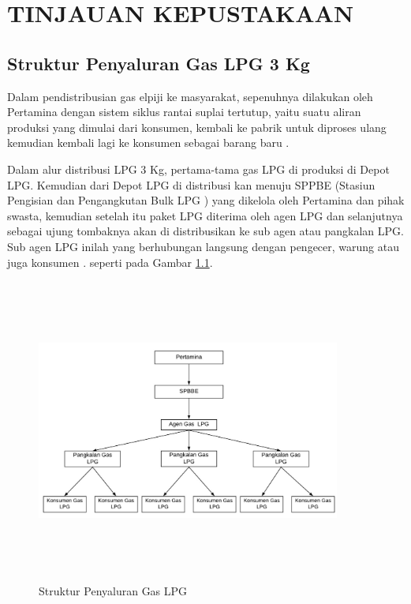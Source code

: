 
\chapter{TINJAUAN KEPUSTAKAAN}                

\section{Struktur Penyaluran Gas LPG 3 Kg}
\par Dalam pendistribusian gas elpiji ke masyarakat, sepenuhnya dilakukan oleh Pertamina dengan sistem siklus rantai suplai tertutup, yaitu suatu aliran produksi yang dimulai dari konsumen, kembali ke pabrik untuk diproses ulang kemudian kembali lagi ke konsumen sebagai barang baru \citep{alurLPG}.
\par Dalam alur distribusi LPG 3 Kg, pertama-tama gas LPG di produksi di Depot LPG. Kemudian dari Depot LPG di distribusi kan menuju SPPBE (Stasiun Pengisian dan Pengangkutan Bulk LPG ) yang dikelola oleh Pertamina dan pihak swasta, kemudian setelah itu paket LPG diterima oleh agen LPG dan selanjutnya sebagai ujung tombaknya akan di distribusikan ke sub agen atau pangkalan LPG. Sub agen LPG inilah yang berhubungan langsung dengan pengecer, warung atau juga konsumen \citep{alurLPG}. seperti pada Gambar \ref{penyaluran}.
\begin{figure}[H]
	\centering
	\includegraphics [width = 10cm, height= 10cm]{gambar/struktur-penyaluran}
	\caption{Struktur Penyaluran Gas LPG}
	\label{penyaluran}
\end{figure}



